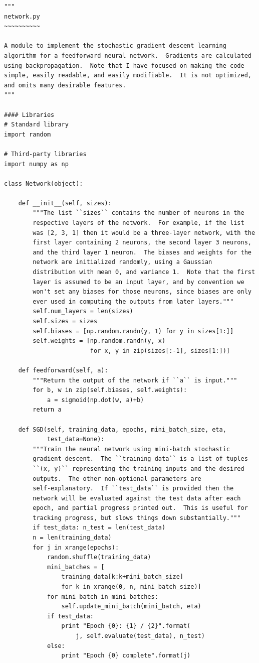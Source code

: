 \begin{verbatim}
"""
network.py
~~~~~~~~~~

A module to implement the stochastic gradient descent learning
algorithm for a feedforward neural network.  Gradients are calculated
using backpropagation.  Note that I have focused on making the code
simple, easily readable, and easily modifiable.  It is not optimized,
and omits many desirable features.
"""

#### Libraries
# Standard library
import random

# Third-party libraries
import numpy as np

class Network(object):

    def __init__(self, sizes):
        """The list ``sizes`` contains the number of neurons in the
        respective layers of the network.  For example, if the list
        was [2, 3, 1] then it would be a three-layer network, with the
        first layer containing 2 neurons, the second layer 3 neurons,
        and the third layer 1 neuron.  The biases and weights for the
        network are initialized randomly, using a Gaussian
        distribution with mean 0, and variance 1.  Note that the first
        layer is assumed to be an input layer, and by convention we
        won't set any biases for those neurons, since biases are only
        ever used in computing the outputs from later layers."""
        self.num_layers = len(sizes)
        self.sizes = sizes
        self.biases = [np.random.randn(y, 1) for y in sizes[1:]]
        self.weights = [np.random.randn(y, x)
                        for x, y in zip(sizes[:-1], sizes[1:])]

    def feedforward(self, a):
        """Return the output of the network if ``a`` is input."""
        for b, w in zip(self.biases, self.weights):
            a = sigmoid(np.dot(w, a)+b)
        return a

    def SGD(self, training_data, epochs, mini_batch_size, eta,
            test_data=None):
        """Train the neural network using mini-batch stochastic
        gradient descent.  The ``training_data`` is a list of tuples
        ``(x, y)`` representing the training inputs and the desired
        outputs.  The other non-optional parameters are
        self-explanatory.  If ``test_data`` is provided then the
        network will be evaluated against the test data after each
        epoch, and partial progress printed out.  This is useful for
        tracking progress, but slows things down substantially."""
        if test_data: n_test = len(test_data)
        n = len(training_data)
        for j in xrange(epochs):
            random.shuffle(training_data)
            mini_batches = [
                training_data[k:k+mini_batch_size]
                for k in xrange(0, n, mini_batch_size)]
            for mini_batch in mini_batches:
                self.update_mini_batch(mini_batch, eta)
            if test_data:
                print "Epoch {0}: {1} / {2}".format(
                    j, self.evaluate(test_data), n_test)
            else:
                print "Epoch {0} complete".format(j)


\end{verbatim}
